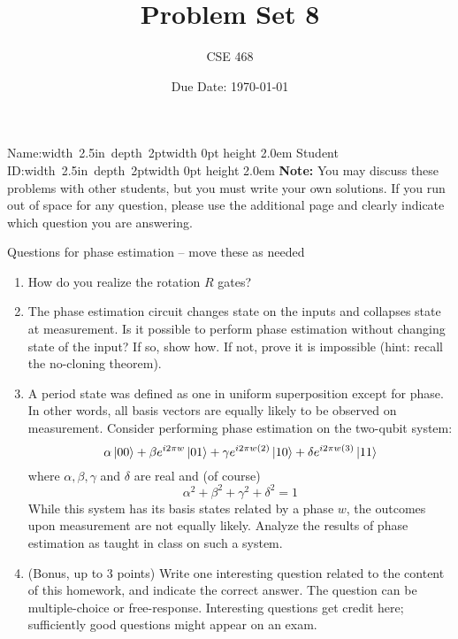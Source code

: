 \documentclass[12pt]{article}
\title{Problem Set 8}
\author{CSE 468}
\date{Due Date: \today}
\newcommand{\NameBlank}{\mbox{\hskip 4pt\vrule width 2.5in depth 2pt}\vrule width 0pt height 2.0em}
\begin{document}
\maketitle

\noindent Name:\NameBlank{} \newline
\noindent Student ID:\NameBlank{} \newline
\textbf{Note:} You may discuss these problems with other students, but you must write your own solutions. If you run out of space for any question, please use the additional page and clearly indicate which question you are answering.

Questions for phase estimation -- move these as needed

\begin{enumerate}[font=\bfseries]
    \item How do you realize the rotation $R$ gates?
    \item The phase estimation circuit changes state on the inputs and collapses state at measurement.  Is it possible to perform phase estimation without changing state of the input?  If so, show how. If not, prove it is impossible (hint:  recall the no-cloning theorem).
    \item A period state was defined as one in uniform superposition except for phase.  In other words, all basis vectors are equally likely to be observed on measurement.  Consider performing phase estimation on the two-qubit system:
    \[ \alpha\ket{00} + \beta e^{i 2\pi w}\ket{01} 
        + \gamma e^{i 2\pi w(2)}\ket{10} + \delta e^{i 2\pi w(3)}\ket{11}
    \]
    where $\alpha, \beta, \gamma$ and $\delta$ are real and (of course)
    \[ \alpha^{2} + \beta^{2} + \gamma^{2} + \delta^{2}=1 \]
    While this system has its basis states related by a phase $w$, the outcomes upon measurement are not equally likely.  Analyze the results of phase estimation as taught in class on such a system.
    \item (Bonus, up to 3 points) Write one interesting question related to the content of this homework, and indicate the correct answer. The question can be multiple-choice or free-response.  Interesting questions get credit here;  sufficiently good questions might appear on an exam.
    
\end{enumerate}
\end{document}
